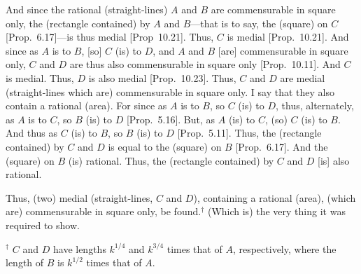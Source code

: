 \begin{Parallel}{}{}
{And since the rational (straight-lines) $A$ and $B$ are commensurable in square only,  the (rectangle contained) by $A$ and $B$---that is to
say, the (square) on $C$ [Prop.~6.17]---is thus medial
[Prop~10.21]. Thus, $C$ is medial
[Prop.~10.21]. And since as $A$ is to $B$, [so]
$C$ (is) to $D$, and $A$ and $B$ [are] commensurable in square only, 
$C$ and $D$ are thus also commensurable in square only [Prop.~10.11]. And $C$ is medial.
Thus, $D$ is also medial [Prop.~10.23]. 
Thus, $C$ and $D$ are medial (straight-lines which are) commensurable
in square only. I say that they also contain a rational (area).
For since as $A$ is to $B$, so $C$ (is) to $D$, thus, alternately,
as $A$ is to $C$, so $B$ (is) to $D$ [Prop.~5.16]. 
But, as $A$ (is) to $C$, (so) $C$ (is) to $B$. 
And thus as $C$ (is) to $B$, so $B$ (is) to $D$ [Prop.~5.11].
 Thus, the (rectangle contained) by $C$ and $D$ is equal to the (square) on $B$ [Prop.~6.17]. And the (square) on $B$ (is) rational. Thus, the (rectangle contained) by $C$ and $D$ [is] also rational.
 
Thus, (two) medial (straight-lines, $C$ and $D$), containing a rational (area), (which are) commensurable in square only, be found.$^\dag$ (Which is) the very thing it was required to show.}
\end{Parallel}
{\footnotesize\noindent$^\dag$ $C$ and $D$ have lengths $k^{1/4}$ and $k^{3/4}$ times that of $A$, respectively, where the length of $B$ is $k^{1/2}$ times that of $A$.}

